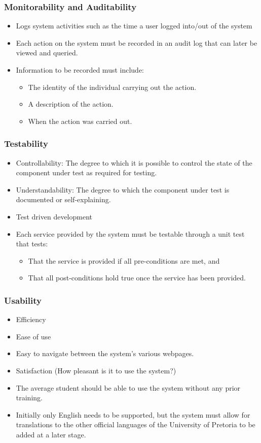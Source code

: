 \documentclass[12pt, oneside]{article}
\begin{document}
		\subsubsection{Monitorability and Auditability}
			\begin{itemize}
				\item Logs system activities such as the time a user logged into/out of the system
				\item Each action on the system must be recorded in an audit log that can later be viewed and queried.
				\item Information to be recorded must include:
				\begin{itemize}
					\item The identity of the individual carrying out the action.
					\item A description of the action.
					\item When the action was carried out.
				\end{itemize}
			\end{itemize}
		\subsubsection{Testability}
			\begin{itemize}
				\item Controllability: The degree to which it is possible to control the state of the component under test as required for testing.
				\item Understandability: The degree to which the component under test is documented or self-explaining.
				\item Test driven development
				\item Each service provided by the system must be testable through a unit test that tests:
				\begin{itemize}
					\item That the service is provided if all pre-conditions are met, and
					\item That all post-conditions hold true once the service has been provided.
				\end{itemize}
			\end{itemize}
		\subsubsection{Usability}
			\begin{itemize}
				\item Efficiency
				\item Ease of use
				\item Easy to navigate between the system's various webpages.
				\item Satisfaction (How pleasant is it to use the system?)
				\item The average student should be able to use the system without any prior training.
				\item Initially only English needs to be supported, but the system must allow for translations to the other official languages of the University of Pretoria to be added at a later stage.
			\end{itemize}
\end{document}

